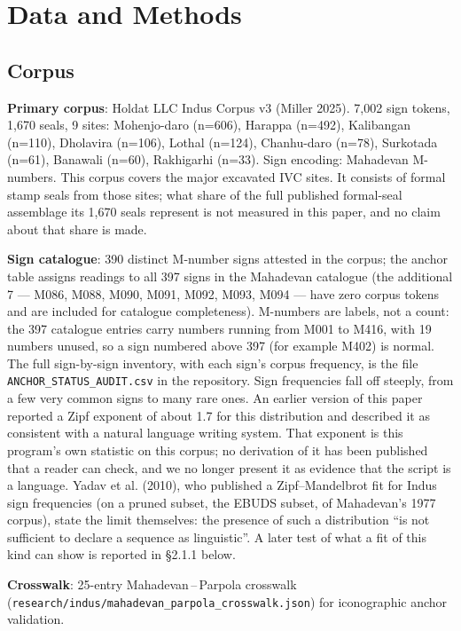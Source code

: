 \documentclass[11pt]{article}
\begin{document}
\section{Data and Methods}\label{data-and-methods}

\subsection{Corpus}\label{corpus}

\textbf{Primary corpus}: Holdat LLC Indus Corpus v3 (Miller 2025). 7,002
sign tokens, 1,670 seals, 9 sites: Mohenjo-daro (n=606), Harappa
(n=492), Kalibangan (n=110), Dholavira (n=106), Lothal (n=124),
Chanhu-daro (n=78), Surkotada (n=61), Banawali (n=60), Rakhigarhi
(n=33). Sign encoding: Mahadevan M-numbers. This corpus covers the major excavated IVC sites. It consists of formal stamp seals from those sites; what share of the full published formal-seal assemblage its 1,670 seals represent is not measured in this paper, and no claim about that share is made.

\textbf{Sign catalogue}: 390 distinct M-number signs attested in the corpus; the anchor table assigns readings to all 397 signs in the Mahadevan catalogue (the additional 7 --- M086, M088, M090, M091, M092, M093, M094 --- have zero corpus tokens and are included for catalogue completeness). M-numbers are labels, not a count: the 397 catalogue entries carry numbers running from M001 to M416, with 19 numbers unused, so a sign numbered above 397 (for example M402) is normal. The full sign-by-sign inventory, with each sign's corpus frequency, is the file \texttt{ANCHOR\_STATUS\_AUDIT.csv} in the repository. Sign frequencies fall off steeply, from a few very common signs to many rare ones. An earlier version of this paper reported a Zipf exponent of about 1.7 for this distribution and described it as consistent with a natural language writing system. That exponent is this program's own statistic on this corpus; no derivation of it has been published that a reader can check, and we no longer present it as evidence that the script is a language. Yadav et al. (2010), who published a Zipf--Mandelbrot fit for Indus sign frequencies (on a pruned subset, the EBUDS subset, of Mahadevan's 1977 corpus), state the limit themselves: the presence of such a distribution ``is not sufficient to declare a sequence as linguistic''. A later test of what a fit of this kind can show is reported in §2.1.1 below.

\textbf{Crosswalk}: 25-entry Mahadevan\,--\,Parpola crosswalk
(\texttt{research/indus/mahadevan\_parpola\_crosswalk.json}) for iconographic anchor validation.
\end{document}
